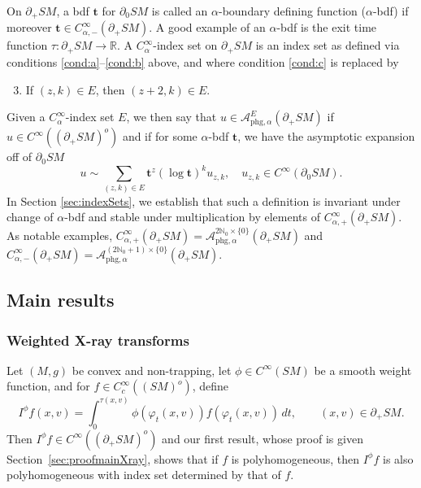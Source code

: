\documentclass[11pt]{article}
\newcommand{\Subsection}{\subsection}
\newcommand{\Subsubsection}{\subsubsection}
\newenvironment{enumeratea}
{\bgroup\def\theenumi{\alph{enumi}}\begin{enumerate}}
{\end{enumerate}\egroup}
\theoremstyle{plain}
\theoremstyle{definition}
\theoremstyle{remark}
\def\Rm{{\mathbb{R}}}
\def\Nm{{\mathbb{N}}}
\def\A{\mathcal{A}}
\newcommand{\bt}{{\boldsymbol{t}}}
\newcommand{\phg}{\mathrm{phg}}
\begin{document}
On $\partial_+ SM$, a bdf $\bt$ for $\partial_0 SM$ is called an $\alpha$-boundary defining function ($\alpha$-bdf) if moreover $\bt\in C_{\alpha,-}^\infty(\partial_+ SM)$. A good example of an $\alpha$-bdf is the exit time function $\tau\colon \partial_+ SM\to \Rm$. A $C_\alpha^\infty$-index set on $\partial_+ SM$ is an index set as defined via conditions \eqref{cond:a}--\eqref{cond:b} above, and where condition \eqref{cond:c} is replaced by
\begin{enumeratea}\setcounter{enumi}{2}\renewcommand{\theenumi}{\alph{enumi}'}
\item\label{cond:c'}
If $(z,k)\in E$, then $(z+2,k)\in E$.
\end{enumeratea}
Given a $C_\alpha^\infty$-index set $E$, we then say that $u\!\in \!\A_{\phg,\alpha}^E(\partial_+ SM)$ if $u\!\in\! C^\infty((\partial_+ SM)^o)$ and if for some $\alpha$-bdf $\bt$, we have the asymptotic expansion off of $\partial_0 SM$
\begin{equation*}
u\sim \sum_{(z,k)\in E} \bt^z (\log \bt)^k u_{z,k},\quad u_{z,k}\in C^\infty(\partial_0 SM).
\end{equation*}
In Section \ref{sec:indexSets}, we establish that such a definition is invariant under change of $\alpha$-bdf and stable under multiplication by elements of $C_{\alpha,+}^\infty(\partial_+ SM)$. As notable examples, $C_{\alpha,+}^\infty(\partial_+ SM) = \A_{\phg,\alpha}^{2\Nm_0\times \{0\}} (\partial_+ SM)$ and $C_{\alpha,-}^\infty(\partial_+ SM) = \A_{\phg,\alpha}^{(2\Nm_0+1)\times \{0\}} (\partial_+ SM)$.

\Subsection{Main results} \label{ssec:main}

\Subsubsection*{Weighted X-ray transforms}

Let $(M,g)$ be convex and non-trapping, let $\phi\in C^\infty(SM)$ be a smooth weight function, and for $f\in C_{c}^\infty((SM)^{o})$, define
\begin{equation*}
I^\phi f (x,v) = \int_0^{\tau(x,v)} \phi(\varphi_t(x,v)) f(\varphi_t (x,v))\,dt, \qquad (x,v) \in \partial_+ SM.
\end{equation*}
Then $I^\phi f\in C^\infty((\partial_+ SM)^{o})$ and our first result, whose proof is given Section~\ref{sec:proofmainXray}, shows that if $f$ is polyhomogeneous, then $I^\phi f$ is also polyhomogeneous with index set determined by that of $f$.
\end{document}
